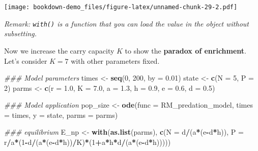 \documentclass[
]{book}
\newenvironment{Shaded}{\begin{snugshade}}{\end{snugshade}}
\newcommand{\CommentTok}[1]{\textcolor[rgb]{0.56,0.35,0.01}{\textit{#1}}}
\newcommand{\DataTypeTok}[1]{\textcolor[rgb]{0.13,0.29,0.53}{#1}}
\newcommand{\DecValTok}[1]{\textcolor[rgb]{0.00,0.00,0.81}{#1}}
\newcommand{\FloatTok}[1]{\textcolor[rgb]{0.00,0.00,0.81}{#1}}
\newcommand{\KeywordTok}[1]{\textcolor[rgb]{0.13,0.29,0.53}{\textbf{#1}}}
\newcommand{\NormalTok}[1]{#1}
\newcommand{\OperatorTok}[1]{\textcolor[rgb]{0.81,0.36,0.00}{\textbf{#1}}}
\newcommand{\StringTok}[1]{\textcolor[rgb]{0.31,0.60,0.02}{#1}}
\begin{document}
\texttt{[image: bookdown-demo\_files/figure-latex/unnamed-chunk-29-2.pdf]}

\emph{Remark: \texttt{with()} is a function that you can load the value in the object without subsetting.}

Now we increase the carry capacity \(K\) to show the \textbf{paradox of enrichment}. Let's consider \(K = 7\) with other parameters fixed.

\begin{Shaded}
\begin{Highlighting}[]
\CommentTok{### Model parameters}
\NormalTok{times <-}\StringTok{ }\KeywordTok{seq}\NormalTok{(}\DecValTok{0}\NormalTok{, }\DecValTok{200}\NormalTok{, }\DataTypeTok{by =} \FloatTok{0.01}\NormalTok{)  }
\NormalTok{state <-}\StringTok{ }\KeywordTok{c}\NormalTok{(}\DataTypeTok{N =} \DecValTok{5}\NormalTok{, }\DataTypeTok{P =} \DecValTok{2}\NormalTok{)  }
\NormalTok{parms <-}\StringTok{ }\KeywordTok{c}\NormalTok{(}\DataTypeTok{r =} \FloatTok{1.0}\NormalTok{, }\DataTypeTok{K =} \FloatTok{7.0}\NormalTok{, }\DataTypeTok{a =} \FloatTok{1.3}\NormalTok{, }\DataTypeTok{h =} \FloatTok{0.9}\NormalTok{, }\DataTypeTok{e =} \FloatTok{0.6}\NormalTok{, }\DataTypeTok{d =} \FloatTok{0.5}\NormalTok{) }

\CommentTok{### Model application}
\NormalTok{pop_size <-}\StringTok{ }\KeywordTok{ode}\NormalTok{(}\DataTypeTok{func =}\NormalTok{ RM_predation_model, }\DataTypeTok{times =}\NormalTok{ times, }\DataTypeTok{y =}\NormalTok{ state, }\DataTypeTok{parms =}\NormalTok{ parms)}

\CommentTok{### equilibrium}
\NormalTok{E_np <-}\StringTok{ }\KeywordTok{with}\NormalTok{(}\KeywordTok{as.list}\NormalTok{(parms), }
             \KeywordTok{c}\NormalTok{(}\DataTypeTok{N =}\NormalTok{ d}\OperatorTok{/}\NormalTok{(a}\OperatorTok{*}\NormalTok{(e}\OperatorTok{-}\NormalTok{d}\OperatorTok{*}\NormalTok{h)),}
               \DataTypeTok{P =}\NormalTok{ r}\OperatorTok{/}\NormalTok{a}\OperatorTok{*}\NormalTok{(}\DecValTok{1}\OperatorTok{-}\NormalTok{d}\OperatorTok{/}\NormalTok{(a}\OperatorTok{*}\NormalTok{(e}\OperatorTok{-}\NormalTok{d}\OperatorTok{*}\NormalTok{h))}\OperatorTok{/}\NormalTok{K)}\OperatorTok{*}\NormalTok{(}\DecValTok{1}\OperatorTok{+}\NormalTok{a}\OperatorTok{*}\NormalTok{h}\OperatorTok{*}\NormalTok{d}\OperatorTok{/}\NormalTok{(a}\OperatorTok{*}\NormalTok{(e}\OperatorTok{-}\NormalTok{d}\OperatorTok{*}\NormalTok{h)))))}
\end{Highlighting}
\end{Shaded}
\end{document}
